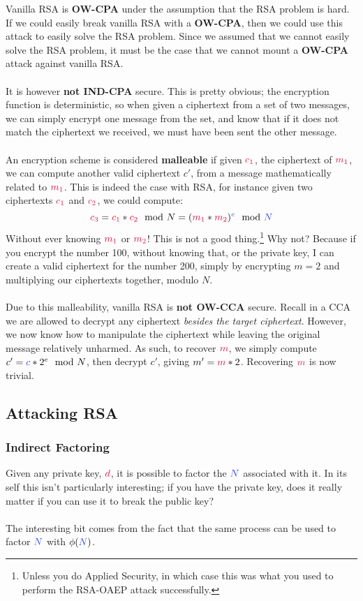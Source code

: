		Vanilla RSA is \textbf{OW-CPA} under the assumption that the RSA problem is hard. If we could easily break vanilla RSA with a \textbf{OW-CPA}, then we could use this attack to easily solve the RSA problem. Since we assumed that we cannot easily solve the RSA problem, it must be the case that we cannot mount a \textbf{OW-CPA} attack against vanilla RSA.\\
		\\
		It is however \textbf{not IND-CPA} secure. This is pretty obvious; the encryption function is deterministic, so when given a ciphertext from a set of two messages, we can simply encrypt one message from the set, and know that if it does not match the ciphertext we received, we must have been sent the other message.\\
		\\
		An encryption scheme is considered \textbf{malleable} if given $\csubc{1}$, the ciphertext of $\csubm{1}$, we can compute another valid ciphertext $c'$, from a message mathematically related to $\csubm{1}$. This is indeed the case with RSA, for instance given two ciphertexts $\csubc{1}$ and $\csubc{2}$, we could compute:
		$$\csubc{3} = \csubc{1}*\csubc{2} \mod N = (\csubm{1} * \csubm{2})^\ce \mod \cN$$ 
		Without ever knowing $\csubm{1}$ or $\csubm{2}$! This is not a good thing.\footnote{Unless you do Applied Security, in which case this was what you used to perform the RSA-OAEP attack successfully.} Why not? Because if you encrypt the number 100, without knowing that, or the private key, I can create a valid ciphertext for the number 200, simply by encrypting $m = 2$ and multiplying our ciphertexts together, modulo $N$.\\
		\\
		Due to this malleability, vanilla RSA is \textbf{not OW-CCA} secure. Recall in a CCA we are allowed to decrypt any ciphertext \textit{besides the target ciphertext}. However, we now know how to manipulate the ciphertext while leaving the original message relatively unharmed. As such, to recover $\cm$, we simply compute $c' = \cc*2^e \mod N$, then decrypt $c'$, giving $m' = \cm * 2$. Recovering $\cm$ is now trivial.

	\subsection{Attacking RSA}
		\subsubsection{Indirect Factoring}
			Given any private key, $\cd$, it is possible to factor the $\cN$ associated with it. In its self this isn't particularly interesting; if you have the private key, does it really matter if you can use it to break the public key?\\
			\\
			The interesting bit comes from the fact that the same process can be used to factor $\cN$ with $\phi(\cN)$.

